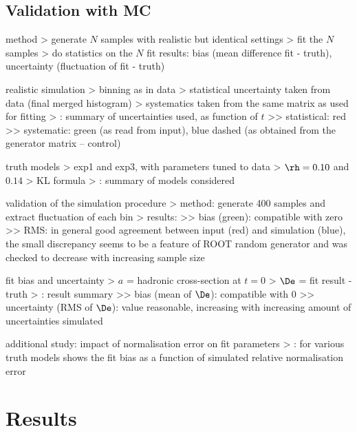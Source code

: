 \section[validation-mc]{Validation with MC}

\> method
\>> generate $N$ samples with realistic but identical settings
\>> fit the $N$ samples
\>> do statistics on the $N$ fit results: bias (mean difference fit - truth), uncertainty (fluctuation of fit - truth)

\> realistic simulation
\>> binning as in data
\>> statistical uncertainty taken from data (final merged histogram)
\>> systematics taken from the same matrix as used for fitting
\>> : summary of uncertainties used, as function of $t$
\>>> statistical: red
\>>> systematic: green (as read from input), blue dashed (as obtained from the generator matrix -- control)

\> truth models
\>> exp1 and exp3, with parameters tuned to data
\>> $\rh = 0.10$ and $0.14$
\>> KL formula
\>> : summary of models considered

\> validation of the simulation procedure
\>> method: generate 400 samples and extract fluctuation of each bin
\>> results: 
\>>> bias (green): compatible with zero
\>>> RMS: in general good agreement between input (red) and simulation (blue), the small discrepancy seems to be a feature of ROOT random generator and was checked to decrease with increasing sample size

\> fit bias and uncertainty
\>> $a$ = hadronic cross-section at $t=0$
\>> $\De$ = fit result - truth
\>> : result summary
\>>> bias (mean of $\De$): compatible with 0
\>>> uncertainty (RMS of $\De$): value reasonable, increasing with increasing amount of uncertainties simulated

\> additional study: impact of normalisation error on fit parameters
\>> : for various truth models shows the fit bias as a function of simulated relative normalisation error









\chapter[results]{Results}

